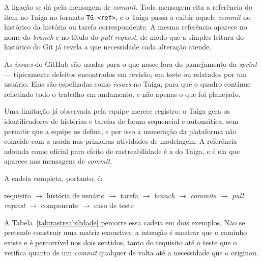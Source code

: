 \documentclass[a4paper,12pt,oneside,openany]{book}
\begin{document}
A ligação se dá pela mensagem de \textit{commit}. Toda mensagem cita a
referência do item no Taiga no formato \texttt{TG-<ref>}, e o Taiga passa a
exibir aquele \textit{commit} no histórico da história ou tarefa
correspondente. A mesma referência aparece no nome do \textit{branch} e no
título do \textit{pull request}, de modo que a simples leitura do histórico do
Git já revela a que necessidade cada alteração atende.

As \textit{issues} do GitHub são usadas para o que nasce fora do planejamento
da \textit{sprint} --- tipicamente defeitos encontrados em revisão, em teste ou
relatados por um usuário. Elas são espelhadas como \textit{issues} no Taiga,
para que o quadro continue refletindo todo o trabalho em andamento, e não
apenas o que foi planejado.

Uma limitação já observada pela equipe merece registro: o Taiga gera os
identificadores de histórias e tarefas de forma sequencial e automática, sem
permitir que a equipe os defina, e por isso a numeração da plataforma não
coincide com a usada nas primeiras atividades de modelagem. A referência
adotada como oficial para efeito de rastreabilidade é a do Taiga, e é ela que
aparece nas mensagens de \textit{commit}.

A cadeia completa, portanto, é:

\begin{center}
requisito $\rightarrow$ história de usuário $\rightarrow$ tarefa $\rightarrow$
\textit{branch} $\rightarrow$ \textit{commits} $\rightarrow$ \textit{pull
request} $\rightarrow$ componente $\rightarrow$ caso de teste
\end{center}

A Tabela~\ref{tab:rastreabilidade} percorre essa cadeia em dois exemplos. Não
se pretende construir uma matriz exaustiva: a intenção é mostrar que o caminho
existe e é percorrível nos dois sentidos, tanto do requisito até o teste que o
verifica quanto de um \textit{commit} qualquer de volta até a necessidade que o
originou.
\end{document}
